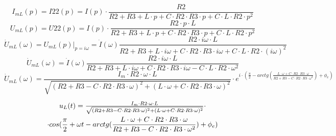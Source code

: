 \documentclass[a4paper,12pt]{article}
\begin{document}
$$I_{mL}(p)=I22(p)=I(p)\cdot \frac{R2}{R2+R3+L\cdot p+C\cdot R2\cdot R3\cdot p+C\cdot L\cdot R2\cdot p^2}$$
$$U_{mL}(p)=U22(p)=I(p)\cdot \frac{R2\cdot p\cdot L}{R2+R3+L\cdot p+C\cdot R2\cdot R3\cdot p+C\cdot L\cdot R2\cdot p^2}$$
$$\dot{U}_{mL}(\omega) = U_{mL}(p)\vert_{p=i\omega}=\dot{I}(\omega)\frac{R2\cdot i\omega\cdot L}{R2+R3+L\cdot {i\omega}+C\cdot R2\cdot R3\cdot {i\omega}+C\cdot L\cdot R2\cdot (i\omega)^2}$$
$$\dot{U}_{mL}(\omega) =\dot{I}(\omega)\frac{R2\cdot i\omega\cdot L}{R2+R3+L\cdot {i\omega}+C\cdot R2\cdot R3\cdot {i\omega}-C\cdot L\cdot R2\cdot \omega^2}$$
$$\dot{U}_{mL}(\omega) =\frac{I_m\cdot R2\cdot \omega\cdot L}{\sqrt{(R2+R3-C\cdot R2\cdot R3\cdot \omega)^2+(L\cdot \omega+C\cdot R2\cdot R3\cdot \omega)^2}}\cdot e^{i\cdot (\frac{\pi}{2}-arctg(\frac{L\cdot \omega+C\cdot R2\cdot R3\cdot \omega}{R2+R3-C\cdot R2\cdot R3\cdot \omega^2})+\phi_e)}$$

\begin{multline}
$$u_{L}(t) =\frac{I_m\cdot R2\cdot \omega\cdot L}{\sqrt{(R2+R3-C\cdot R2\cdot R3\cdot \omega)^2+(L\cdot \omega+C\cdot R2\cdot R3\cdot \omega)^2}}\cdot \\* \cdot cos(\frac{\pi}{2}+\omega t - arctg(\frac{L\cdot \omega+C\cdot R2\cdot R3\cdot \omega}{R2+R3-C\cdot R2\cdot R3\cdot \omega^2})+\phi_e)$$
\end{multline}
\end{document}
